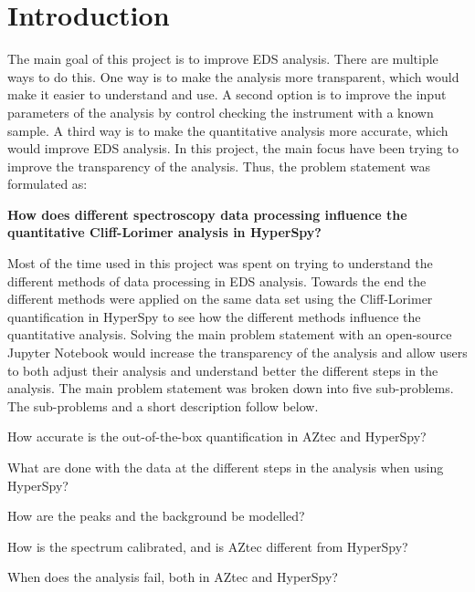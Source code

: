 \chapter{Introduction}
\label{chap:introduction}

%
%
The main goal of this project is to improve EDS analysis. There are multiple ways to do this.
One way is to make the analysis more transparent, which would make it easier to understand and use.
A second option is to improve the input parameters of the analysis by control checking the instrument with a known sample.
A third way is to make the quantitative analysis more accurate, which would improve EDS analysis.
In this project, the main focus have been trying to improve the transparency of the analysis. Thus, the problem statement was formulated as:


\begin{mainprob}
    \label{mainproblem}
    \textbf{How does different spectroscopy data processing influence the quantitative Cliff-Lorimer analysis in HyperSpy?}
\end{mainprob}

Most of the time used in this project was spent on trying to understand the different methods of data processing in EDS analysis.
Towards the end the different methods were applied on the same data set using the Cliff-Lorimer quantification in HyperSpy to see how the different methods influence the quantitative analysis.
Solving the main problem statement with an open-source Jupyter Notebook would increase the transparency of the analysis and allow users to both adjust their analysis and understand better the different steps in the analysis.
The main problem statement was broken down into five sub-problems.
The sub-problems and a short description follow below.


\begin{subprob} \label{subproblem1}
    How accurate is the out-of-the-box quantification in AZtec and HyperSpy?
\end{subprob}
\begin{subprob} \label{subproblem2}
    What are done with the data at the different steps in the analysis when using HyperSpy?
\end{subprob}
\begin{subprob} \label{subproblem3}
    How are the peaks and the background be modelled?
\end{subprob}
\begin{subprob} \label{subproblem4}
    How is the spectrum calibrated, and is AZtec different from HyperSpy?
\end{subprob}
\begin{subprob} \label{subproblem6}
    When does the analysis fail, both in AZtec and HyperSpy?
\end{subprob}


